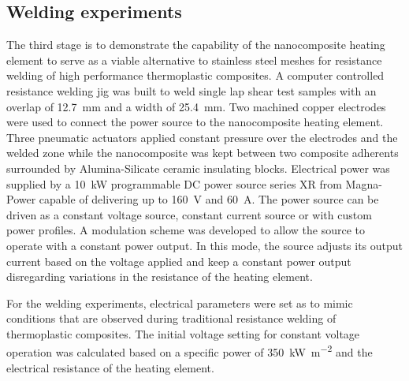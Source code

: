 \documentclass[11pt,review,times]{elsarticle}
\begin{document}
\subsection{Welding experiments}

The third stage is to demonstrate the capability of the nanocomposite heating element to serve as a viable alternative to stainless steel meshes for resistance welding of high performance thermoplastic composites. 
A computer controlled resistance welding jig was built to weld single lap shear test samples with an overlap of \SI{12.7}{\milli\metre} and a width of \SI{25.4}{\milli\metre}. 
Two machined copper electrodes were used to connect the power source to the nanocomposite heating element. 
Three pneumatic actuators applied constant pressure over the electrodes and the welded zone while the nanocomposite was kept between two composite adherents surrounded by Alumina-Silicate ceramic insulating blocks. 
Electrical power was supplied by a \SI{10}{\kilo\watt} programmable DC power source series XR from Magna-Power capable of delivering up to \SI{160}{\volt} and \SI{60}{\ampere}. 
The power source can be driven as a constant voltage source, constant current source or with custom power profiles. 
A modulation scheme was developed to allow the source to operate with a constant power output. 
In this mode, the source adjusts its output current based on the voltage applied and keep a constant power output disregarding variations in the resistance of the heating element. 


For the welding experiments, electrical parameters were set as to mimic conditions that are observed during traditional resistance welding of thermoplastic composites. 
The initial voltage setting for constant voltage operation was calculated based on a specific power of \SI{350}{\kilo\watt\per\square\metre} and the electrical resistance of the heating element. 
\end{document}
